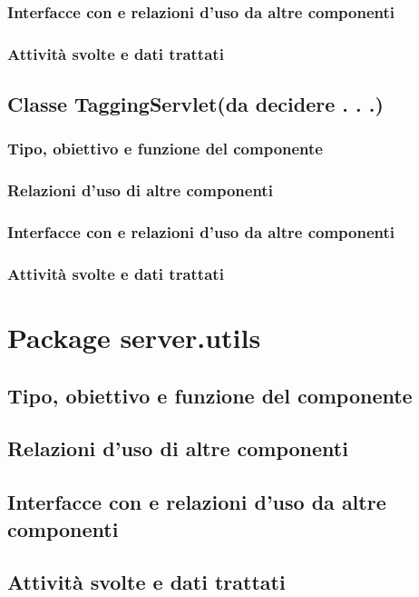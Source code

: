 \subsubsection*{Interfacce con e relazioni d'uso da altre componenti}
\subsubsection*{Attivit\`a svolte e dati trattati}

\newpage
\subsection{Classe TaggingServlet(da decidere . . .)}
\subsubsection*{Tipo, obiettivo e funzione del componente}
\subsubsection*{Relazioni d'uso di altre componenti}
\subsubsection*{Interfacce con e relazioni d'uso da altre componenti}
\subsubsection*{Attivit\`a svolte e dati trattati}

\section{Package server.utils} %
\subsection*{Tipo, obiettivo e funzione del componente}
\subsection*{Relazioni d'uso di altre componenti}
\subsection*{Interfacce con e relazioni d'uso da altre componenti}
\subsection*{Attivit\`a svolte e dati trattati}

